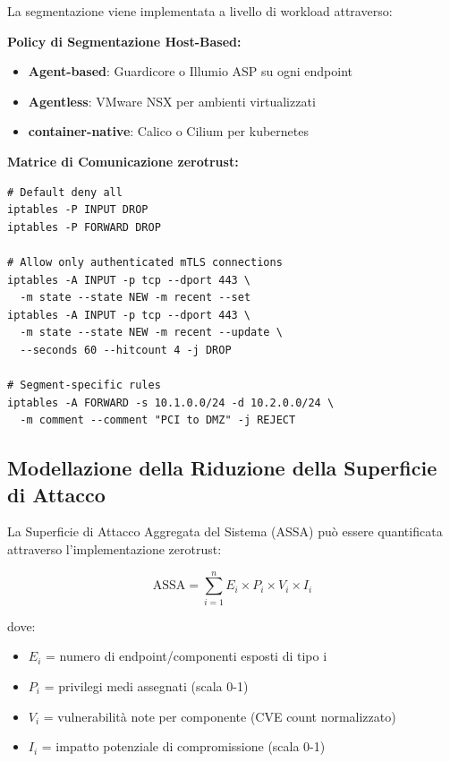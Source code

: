 La segmentazione viene implementata a livello di workload attraverso:

\textbf{Policy di Segmentazione Host-Based:}
\begin{itemize}
    \item \textbf{Agent-based}: Guardicore o Illumio ASP su ogni endpoint
    \item \textbf{Agentless}: VMware NSX per ambienti virtualizzati
    \item \textbf{\gls{container}-native}: Calico o Cilium per \gls{kubernetes}
\end{itemize}

\textbf{Matrice di Comunicazione \gls{zerotrust}:}
\begin{lstlisting}[caption={Regole iptables per micro-segmentazione},label={lst:iptables}]
# Default deny all
iptables -P INPUT DROP
iptables -P FORWARD DROP

# Allow only authenticated mTLS connections
iptables -A INPUT -p tcp --dport 443 \
  -m state --state NEW -m recent --set
iptables -A INPUT -p tcp --dport 443 \
  -m state --state NEW -m recent --update \
  --seconds 60 --hitcount 4 -j DROP

# Segment-specific rules
iptables -A FORWARD -s 10.1.0.0/24 -d 10.2.0.0/24 \
  -m comment --comment "PCI to DMZ" -j REJECT
\end{lstlisting}

\subsection{\texorpdfstring{\textbf{Modellazione della Riduzione della Superficie di Attacco}}{3.5.2 - Modellazione della Riduzione della Superficie di Attacco}}

La Superficie di Attacco Aggregata del Sistema (ASSA) può essere quantificata attraverso l'implementazione \gls{zerotrust}:

\begin{equation}
\text{ASSA} = \sum_{i=1}^{n} E_i \times P_i \times V_i \times I_i
\end{equation}

dove:
\begin{itemize}
    \item $E_i$ = numero di endpoint/componenti esposti di tipo i
    \item $P_i$ = privilegi medi assegnati (scala 0-1)
    \item $V_i$ = vulnerabilità note per componente (CVE count normalizzato)
    \item $I_i$ = impatto potenziale di compromissione (scala 0-1)
\end{itemize}

